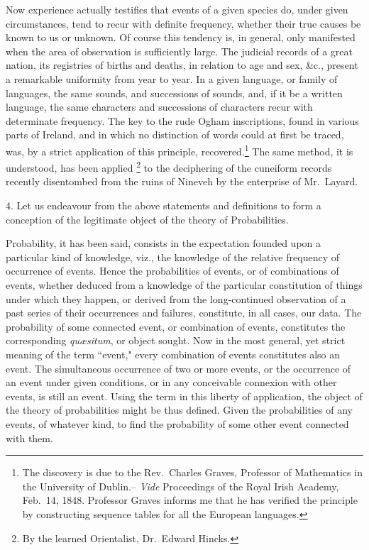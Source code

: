 \documentclass[oneside]{book}
\begin{document}
Now experience actually testifies that events of a given species
do, under given circumstances, tend to recur with definite frequency,
whether their true causes be known to us or unknown.
Of course this tendency is, in general, only manifested when the
area of observation is sufficiently large. The judicial records of
a great nation, its registries of births and deaths, in relation to
age and sex, \&c., present a remarkable uniformity from year to
year. In a given language, or family of languages, the same
sounds, and successions of sounds, and, if it be a written language,
the same characters and successions of characters recur
with determinate frequency. The key to the rude Ogham inscriptions,
found in various parts of Ireland, and in which no
distinction of words could at first be traced, was, by a strict application
of this principle, recovered.\footnote{The discovery is due to the Rev.\
Charles Graves, Professor of Mathematics in the University of Dublin.--
\textit{Vide} Proceedings of the Royal Irish Academy,
Feb.\ 14, 1848. Professor Graves informs me that he has verified the principle
by constructing sequence tables for all the European languages.}%
 The same method, it is understood, has been applied
\footnote{By the learned Orientalist, Dr.\ Edward Hincks.} to the
deciphering of the cuneiform records recently disentombed from
the ruins of Nineveh by the enterprise of Mr.\ Layard.

4. Let us endeavour from the above statements and definitions
to form a conception of the legitimate object of the theory
of Probabilities.

Probability, it has been said, consists in the expectation
founded upon a particular kind of knowledge, viz., the knowledge
of the relative frequency of occurrence of events. Hence
the probabilities of events, or of combinations of events, whether
deduced from a knowledge of the particular constitution of
things under which they happen, or derived from the long-continued
observation of a past series of their occurrences and failures,
constitute, in all cases, our data. The probability of some
connected event, or combination of events, constitutes the corresponding
\textit{qu\ae{}situm},  or object sought. Now in the most general,
yet strict meaning of the term ``event," every combination
of events constitutes also an event. The simultaneous occurrence
of two or more events, or the occurrence of an event under
given conditions, or in any conceivable connexion with other
events, is still an event. Using the term in this liberty of application,
the object of the theory of probabilities might be thus
defined. Given the probabilities of any events, of whatever
kind, to find the probability of some other event connected with
them.
\end{document}
